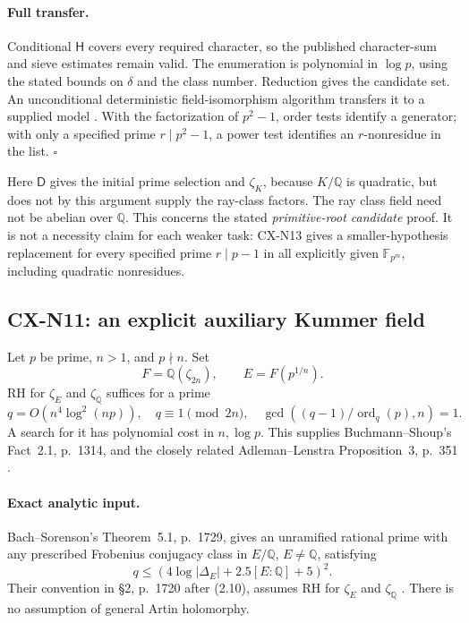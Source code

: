 \documentclass[11pt,a4paper]{article}
\begin{document}
\paragraph{Full transfer.}
Conditional \(\mathsf H\) covers every required character, so the
published character-sum and sieve estimates remain valid. The enumeration
is polynomial in \(\log p\), using the stated bounds on \(\delta\) and
the class number. Reduction gives the candidate set. An unconditional
deterministic field-isomorphism algorithm transfers it to a supplied
model \cite[Theorem~(1.2), p.~330]{CXNLenstra91}. With the factorization of \(p^2-1\), order tests identify a
generator; with only a specified prime \(r\mid p^2-1\), a power test
identifies an \(r\)-nonresidue in the list. \(\square\)

Here \(\mathsf D\) gives the initial prime selection and \(\zeta_K\),
because \(K/\mathbb Q\) is quadratic, but does not by this argument
supply the ray-class factors. The ray class field need not be abelian
over \(\mathbb Q\). This concerns the stated \emph{primitive-root candidate}
proof. It is not a necessity claim for each weaker task:
CX-N13 gives a smaller-hypothesis replacement for every specified
prime \(r\mid p-1\) in all explicitly given \(\mathbb F_{p^m}\),
including quadratic nonresidues.

\subsection{CX-N11: an explicit auxiliary Kummer field}
\label{cx-n11}

Let \(p\) be prime, \(n>1\), and \(p\nmid n\). Set
\[
              F=\mathbb Q(\zeta_{2n}),\qquad E=F(p^{1/n}).
\]
RH for \(\zeta_E\) and \(\zeta_{\mathbb Q}\) suffices for a prime
\[
 q=O(n^4\log^2(np)),\quad q\equiv1\pmod{2n},\quad
 \gcd\!\left((q-1)/\operatorname{ord}_q(p),n\right)=1.             \tag{N11.1}
\]
A search for it has polynomial cost in \(n,\log p\).
This supplies Buchmann--Shoup's Fact~2.1, p.~1314, and the closely
related Adleman--Lenstra Proposition~3, p.~351
\cite{CXNBuchmannShoup96,CXNAdlemanLenstra86}.

\paragraph{Exact analytic input.}
Bach--Sorenson's Theorem~5.1, p.~1729, gives an unramified rational prime
with any prescribed Frobenius conjugacy class in \(E/\mathbb Q\),
\(E\ne\mathbb Q\), satisfying
\[
              q\leq(4\log|\Delta_E|+2.5[E:\mathbb Q]+5)^2.      \tag{N11.2}
\]
Their convention in \S2, p.~1720 after (2.10), assumes RH for
\(\zeta_E\) and \(\zeta_{\mathbb Q}\) \cite{CXNBachSorenson96}.
There is no assumption of general Artin holomorphy.
\end{document}
